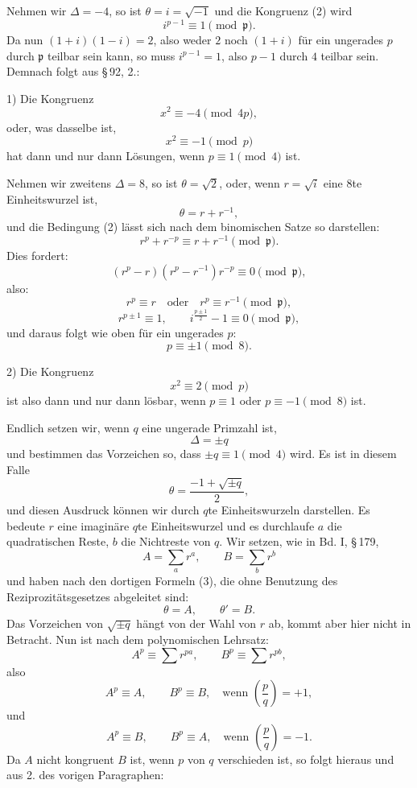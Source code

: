 \documentclass[11pt]{article}
\newcommand{\Jac}[2]{\left(\frac{#1}{#2}\right)}
\begin{document}
Nehmen wir $\Delta=-4$, so ist $\theta=i=\sqrt{-1}$ und die Kongruenz (2) wird
\[
 i^{p-1}\equiv1\pmod{\mathfrak p}.
\]
Da nun $(1+i)(1-i)=2$, also weder $2$ noch $(1+i)$ für ein ungerades $p$ durch $\mathfrak p$ teilbar sein kann, so muss $i^{p-1}=1$, also $p-1$ durch $4$ teilbar sein. Demnach folgt aus \S\,92, 2.:

1) Die Kongruenz
\[
 x^2\equiv -4\pmod{4p},
\]
oder, was dasselbe ist,
\[
 x^2\equiv -1\pmod p
\]
hat dann und nur dann Lösungen, wenn $p\equiv1\pmod4$ ist.

Nehmen wir zweitens $\Delta=8$, so ist $\theta=\sqrt2$, oder, wenn $r=\sqrt i$ eine $8$te Einheitswurzel ist,
\[
 \theta=r+r^{-1},
\]
und die Bedingung (2) lässt sich nach dem binomischen Satze so darstellen:
\[
 r^p+r^{-p}\equiv r+r^{-1}\pmod{\mathfrak p}.
\]
Dies fordert:
\[
 (r^p-r)(r^p-r^{-1})r^{-p}\equiv0\pmod{\mathfrak p},
\]
also:
\[
 r^p\equiv r\quad\text{oder}\quad r^p\equiv r^{-1}\pmod{\mathfrak p},
\]
\[
 r^{p\pm1}\equiv1,
 \qquad
 i^{\frac{p\pm1}{2}}-1\equiv0\pmod{\mathfrak p},
\]
und daraus folgt wie oben für ein ungerades $p$:
\[
 p\equiv\pm1\pmod8.
\]

2) Die Kongruenz
\[
 x^2\equiv2\pmod p
\]
ist also dann und nur dann lösbar, wenn $p\equiv1$ oder $p\equiv-1\pmod8$ ist.

Endlich setzen wir, wenn $q$ eine ungerade Primzahl ist,
\begin{equation}
 \Delta=\pm q
\tag{3}
\end{equation}
und bestimmen das Vorzeichen so, dass $\pm q\equiv1\pmod4$ wird. Es ist in diesem Falle
\[
 \theta=\frac{-1+\sqrt{\pm q}}{2},
\]
und diesen Ausdruck können wir durch $q$te Einheitswurzeln darstellen. Es bedeute $r$ eine imaginäre $q$te Einheitswurzel und es durchlaufe $a$ die quadratischen Reste, $b$ die Nichtreste von $q$. Wir setzen, wie in Bd. I, \S\,179,
\begin{equation}
 A=\sum_a r^a,
 \qquad
 B=\sum_b r^b
\tag{4}
\end{equation}
und haben nach den dortigen Formeln (3), die ohne Benutzung des Reziprozitätsgesetzes abgeleitet sind:
\begin{equation}
 \theta=A,
 \qquad
 \theta'=B.
\tag{5}
\end{equation}
Das Vorzeichen von $\sqrt{\pm q}$ hängt von der Wahl von $r$ ab, kommt aber hier nicht in Betracht. Nun ist nach dem polynomischen Lehrsatz:
\[
 A^p\equiv\sum r^{pa},
 \qquad
 B^p\equiv\sum r^{pb},
\]
also
\[
 A^p\equiv A,
 \qquad
 B^p\equiv B,
 \quad \text{wenn }\Jac{p}{q}=+1,
\]
und
\[
 A^p\equiv B,
 \qquad
 B^p\equiv A,
 \quad \text{wenn }\Jac{p}{q}=-1.
\]
Da $A$ nicht kongruent $B$ ist, wenn $p$ von $q$ verschieden ist, so folgt hieraus und aus 2. des vorigen Paragraphen:
\end{document}
